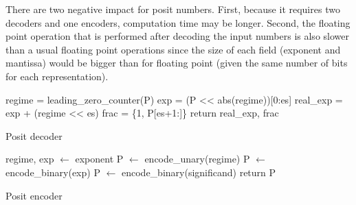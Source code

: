 There are two negative impact for posit numbers. First, because it requires two decoders and one encoders, computation time may be longer. Second, the floating point operation that is performed after decoding the input numbers is also slower than a usual floating point operations since the size of each field (exponent and mantissa) would be bigger than for floating point (given the same number of bits for each representation). 




\begin{algorithm}[H]
\SetAlgoLined
{}
regime = leading\_zero\_counter(P)\;
exp = (P << abs(regime))[0:es]\;
real\_exp = exp + (regime << es)\;
frac = \{1, P[es+1:]\}\;
return real\_exp, frac\;
\caption{Posit decoder}
\label{alg:posit_dec}
\end{algorithm}

\begin{algorithm}[H]
\SetAlgoLined
{}
regime, exp $\leftarrow$ exponent\;
P $\leftarrow$ encode\_unary(regime)\;
P $\leftarrow$ encode\_binary(exp)\;
P $\leftarrow$ encode\_binary(significand)\;
return P\;
\caption{Posit encoder}
\label{alg:posit_enc}
\end{algorithm}


